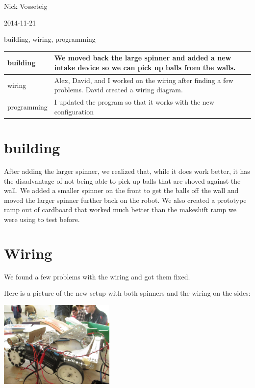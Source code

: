 Nick Vosseteig

2014-11-21

building, wiring, programming

\begin{tabular}{|p{5cm}|p{5cm}|}
 \hline
 building&
We moved back the large spinner and added a new intake device so we can pick up balls from the walls.
 \\
 \hline
wiring&
Alex, David, and I worked on the wiring after finding a few problems. David created a wiring diagram.
 \\
 \hline
programming&
I updated the program so that it works with the new configuration
 \\
 \hline
\end{tabular}

\section*{building}
After adding the larger spinner, we realized that, while it does work better, it has the disadvantage of not being able to pick up balls that are shoved against the wall. We added a smaller spinner on the front to get the balls off the wall and moved the larger spinner further back on the robot. We also created a prototype ramp out of cardboard that worked much better than the makeshift ramp we were using to test before.
\section*{Wiring}
We found a few problems with the wiring and got them fixed.

Here is a picture of the new setup with both spinners and the wiring on the sides:
\begin{center}
 \includegraphics[width=215px]{./Entries/Images/RobotDesignForNovemberTwentyFirstTwoThousandAndFourteenWithIntakeLauncherAndRampWiringIncludedILoveAlexHeIsTheBestNic.jpg}
\end{center}